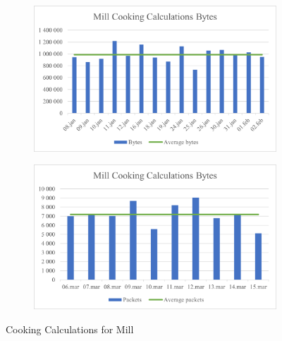 \begin{figure}[H]
    \centering
    \begin{subfigure}{0.49\textwidth}
        \centering
        \includegraphics[width=1\hsize]{figures/Mill_Cooking_Calculations_Bytes.png} 
    \end{subfigure}
    \begin{subfigure}{0.49\textwidth}
        \centering
        \includegraphics[width=1\hsize]{figures/Mill_Cooking_Calculations_Packets.png} 
    \end{subfigure}
    \caption{Cooking Calculations for Mill}
    \label{fig:MillCookingCalculations}
\end{figure}

